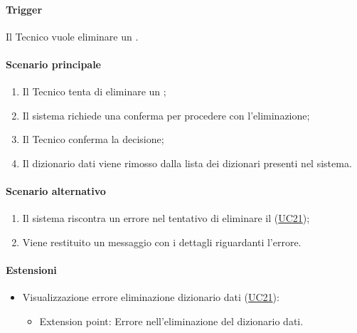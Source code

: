 \paragraph*{Trigger}
Il Tecnico vuole eliminare un .

\paragraph*{Scenario principale}
\begin{enumerate}
  \item Il Tecnico tenta di eliminare un ;
  \item Il sistema richiede una conferma per procedere con l'eliminazione;
  \item Il Tecnico conferma la decisione;
  \item Il dizionario dati viene rimosso dalla lista dei dizionari presenti nel sistema.  
\end{enumerate}

\paragraph*{Scenario alternativo}
\begin{enumerate}
  \item Il sistema riscontra un errore nel tentativo di eliminare il  (\hyperref[UC21]{UC21});
  \item Viene restituito un messaggio con i dettagli riguardanti l'errore.
\end{enumerate}

\paragraph*{Estensioni}
\begin{itemize}
  \item Visualizzazione errore eliminazione dizionario dati (\hyperref[UC21]{UC21}):
  \begin{itemize}
    \item Extension point: Errore nell'eliminazione del dizionario dati.
  \end{itemize}
\end{itemize}